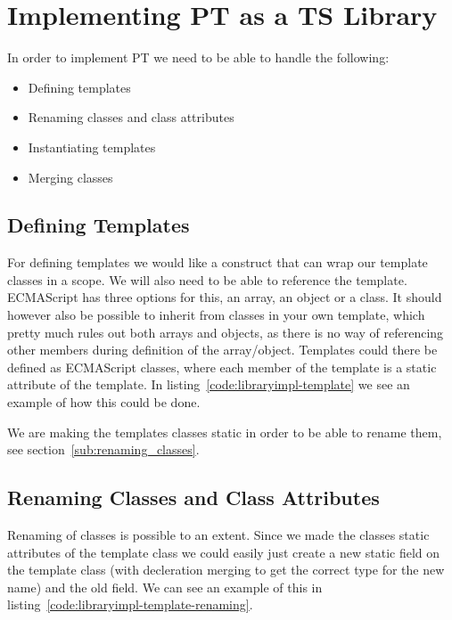 \section{Implementing PT as a TS Library}\label{sec:implementing-pt-as-a-ts-library}

In order to implement PT we need to be able to handle the following:

\begin{itemize}
    \item Defining templates
    \item Renaming classes and class attributes
    \item Instantiating templates
    \item Merging classes
\end{itemize}

\subsection{Defining Templates}\label{subsec:defining-templates}

For defining templates we would like a construct that can wrap our template classes in a scope.
We will also need to be able to reference the template.
ECMAScript has three options for this, an array, an object or a class.
It should however also be possible to inherit from classes in your own template, which pretty much rules out both arrays and objects, as there is no way of referencing other members during definition of the array/object.
Templates could there be defined as ECMAScript classes, where each member of the template is a static attribute of the template. 
In listing~\vref{code:libraryimpl-template} we see an example of how this could be done.

We are making the templates classes static in order to be able to rename them, see section~\vref{sub:renaming_classes}.


\subsection{Renaming Classes and Class Attributes}\label{subsec:renaming-classes-and-class-attributes}

Renaming of classes is possible to an extent.
Since we made the classes static attributes of the template class we could easily just create a new static field on the template class (with decleration merging to get the correct type for the new name) and \cite{deleteop} the old field. 
We can see an example of this in listing~\vref{code:libraryimpl-template-renaming}.

